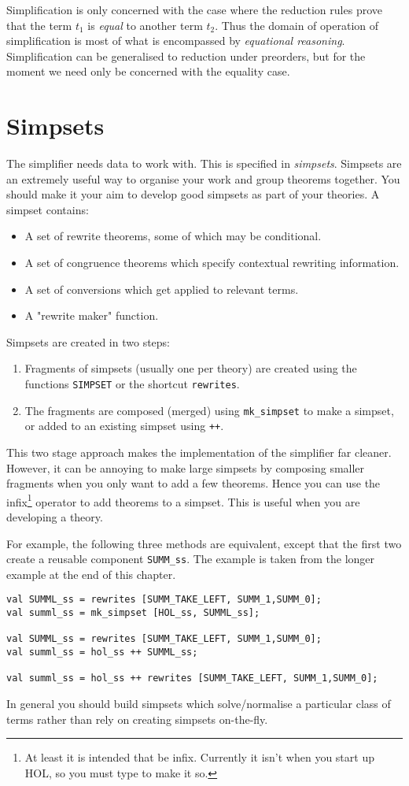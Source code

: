 Simplification is only concerned with the case where the reduction
rules prove that the term $t_1$ is {\it equal} to another term
$t_2$.  Thus the domain of operation of simplification is
most of what is encompassed by {\it equational reasoning}.
Simplification can be generalised to reduction under preorders, but
for the moment we need only be concerned with the equality case.

\section{Simpsets}

The simplifier needs data to work with.  This is specified in
{\em simpsets}. Simpsets are an extremely useful way to organise
your work and group theorems together.  You should make it your
aim to develop good simpsets as part of your theories.
A simpset contains:
\begin{itemize}
    \item A set of rewrite theorems, some of which may be conditional.
    \item A set of congruence theorems which specify
          contextual rewriting information.
    \item A set of conversions which get applied to relevant terms.
    \item A "rewrite maker" function.
\end{itemize}
Simpsets are created in two steps:
\begin{enumerate}
   \item Fragments of simpsets (usually one per theory) are created
using the functions {\tt SIMPSET} or the shortcut {\tt rewrites}.
   \item The fragments are composed (merged) using {\tt mk\_simpset} to
make a simpset, or added to an existing simpset using {\tt ++}.
\end{enumerate}
This two stage approach makes the implementation of the simplifier far
cleaner.  However, it can be annoying to make large simpsets by
composing smaller fragments when you only want to add a few theorems.
Hence you can use the infix\footnote{At least it is intended that
\ml{++} be infix. Currently it isn't when you start up HOL, so you
must type  to make it so.} operator \ml{++} to add
theorems to a simpset.  This is useful when you are developing a
theory.

For example, the following three methods
are equivalent, except that the first two create
a reusable component {\tt SUMM\_ss}.
The example is taken from the longer example at the end of this chapter.
\begin{verbatim}
val SUMML_ss = rewrites [SUMM_TAKE_LEFT, SUMM_1,SUMM_0];
val summl_ss = mk_simpset [HOL_ss, SUMML_ss];

val SUMML_ss = rewrites [SUMM_TAKE_LEFT, SUMM_1,SUMM_0];
val summl_ss = hol_ss ++ SUMML_ss;

val summl_ss = hol_ss ++ rewrites [SUMM_TAKE_LEFT, SUMM_1,SUMM_0];
\end{verbatim}
In general you should build simpsets which solve/normalise a
particular class of terms rather than rely on creating simpsets on-the-fly.

